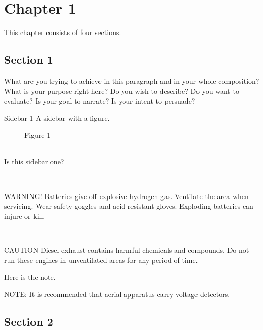 \chapter{Chapter 1}
\label{chapter:1}

This chapter consists of four sections.

\section{Section 1}
\label{section:1}

What are you trying to achieve in this paragraph and in your whole composition? What is your purpose right here? Do you wish to describe? Do you want to evaluate? Is your goal to narrate? Is your intent to persuade?

\begin{sidebar}{Sidebar 1}
A sidebar with a figure.

\begin{figure}[]
\caption{Figure 1}
\label{fig:1} 
\end{figure}\\

Is this sidebar one?
\end{sidebar}\\

\begin{sidebar}[css-class=warning]{WARNING!}
Batteries give off explosive hydrogen gas. Ventilate the area when servicing. Wear safety goggles and acid-resistant gloves. Exploding batteries can injure or kill.
\end{sidebar}\\

\begin{sidebar}[css-class=caution]{CAUTION}
Diesel exhaust contains harmful chemicals and compounds. Do not run these engines in unventilated areas for any period of time.
\end{sidebar}

Here is the note.
\begin{sidebar}[css-class=note]{NOTE:} It is recommended that aerial apparatus carry voltage detectors. \end{sidebar}

\section{Section 2}
\label{section:2}

